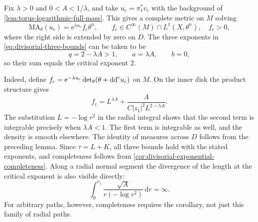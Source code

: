 \begin{example}\label{ex:critical-complete-divisor}
Fix $\lambda>0$ and $0<A<1/\lambda$, and take $u_{\mathrm c}=\pi_1^*v_{\mathrm c}$ with the background of \cref{lem:torus-logarithmic-full-mass}. This gives a complete metric on $M$ solving
\[
 \mathrm{MA}_\theta(u_{\mathrm c})
 =\mathrm{e}^{\lambda u_{\mathrm c}}f_{\mathrm c}\theta^n,
 \qquad f_{\mathrm c}\in C^\infty(M)\cap L^1(X,\theta^n),\quad f_{\mathrm c}>0,
\]
where the right side is extended by zero on $D$. The three exponents in \eqref{eq:divisorial-three-bounds} can be taken to be
\[
 q=2-\lambda A>1,\qquad a=\lambda A,\qquad b=0,
\]
so their sum equals the critical exponent $2$.

Indeed, define $f_{\mathrm c}=\mathrm{e}^{-\lambda u_{\mathrm c}}\det_\theta(\theta+\mathrm{dd}^{\mathrm{c}} u_{\mathrm c})$ on $M$. On the inner disk the product structure gives
\[
 f_{\mathrm c}=L^{\lambda A}
       +\frac{A}{C|z_1|^2L^{2-\lambda A}}.
\]
The substitution $L=-\log r^2$ in the radial integral shows that the second term is integrable precisely when $\lambda A<1$. The first term is integrable as well, and the density is smooth elsewhere. The identity of measures across $D$ follows from the preceding lemma. Since $\tau=L+K$, all three bounds hold with the stated exponents, and completeness follows from \cref{cor:divisorial-exponential-completeness}. Along a radial normal segment the divergence of the length at the critical exponent is also visible directly:
\[
 \int_0^{r_1}\frac{\sqrt A}{r(-\log r^2)}\,\mathrm{d}r=\infty.
\]
For arbitrary paths, however, completeness requires the corollary, not just this family of radial paths.
\end{example}

